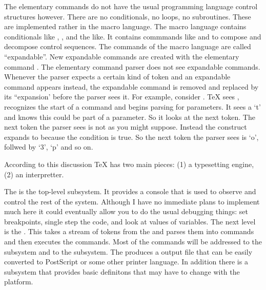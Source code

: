 The elementary commands do not have the usual programming language
control structures however. There are no conditionals, no loops,
no subroutines. These are implemented rather in the macro language.
The macro language contains conditionals like , ,
and the like. It contains commmands like  and 
to compose and decompose control sequences. The commands of the macro
language are called ``expandable''. New expandable commands are
created with the elementary command . The elementary command parser
does not see expandable commands. Whenever the parser expects a certain
kind of token and an expandable command appears instead, the expandable
command is removed and replaced by its ``expansion' before the parser
sees it.  For example, consider .
\TeX{} sees , recognizes the start of a command and begins parsing
for parameters. It sees a `t' and knows this could be part of a parameter.
So it looks at the next token. The next token the parser sees is not
 as you might suppose. Instead the  construct
expands to  because the condition  is true. So the next
token the parser sees is `o', follwed by `3', `p' and so on.

According to this discussion \TeX{} has two main pieces:
(1) a typesetting engine, (2) an interpretter.

The  is the top-level subsystem. It provides a
console that is used to observe and control the rest of the system.
Although I have no immediate plans to implement much here it could
eventually allow you to do the usual debugging things: set breakpoints,
single step the code, and look at values of variables. The next level is
the . This takes a stream of tokens from the
 and parses them into commands and then executes
the commands. Most of the commands will be addressed to the
 subsystem and to the  subsystem. The
 produces a  output file that can be easily
converted to PostScript or some other printer language. In addition
there is a  subsystem that provides basic definitons that
may have to change with the platform.

